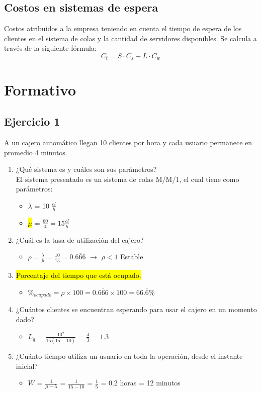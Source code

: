 \documentclass{templateNote}
\begin{document}
\subsection{Costos en sistemas de espera}
\noindent Costos atribuidos a la empresa teniendo en cuenta el tiempo de espera de los clientes en el sistema de colas y la cantidad de servidores disponibles. Se calcula a través de la siguiente fórmula:
\[
    C_t = S \cdot C_s + L \cdot C_w
\]


\newpage
\section{Formativo}
\subsection{Ejercicio 1}
\noindent A un cajero automático llegan 10 clientes por hora y cada usuario permanece en promedio 4 minutos.
\begin{enumerate}[label=(\alph*)]
    \item ¿Qué sistema es y cuáles son sus parámetros? \\
    El sistema presentado es un sistema de colas M/M/1, el cual tiene como parámetros:
    \begin{itemize}
        \item $\lambda$ = 10 $\frac{cl}{h}$
        \item \hl{$\mu$} = $\frac{60}{4} = 15 \frac{cl}{h}$ 
    \end{itemize}
    \item ¿Cuál es la tasa de utilización del cajero?
    \begin{itemize}
        \item $\rho = \frac{\lambda}{\mu} = \frac{10}{15} = 0.\overline{666}$ $\rightarrow$ $\rho < 1$ Estable
    \end{itemize}
    \item \hl{Porcentaje del tiempo que está ocupado.}
    \begin{itemize}
        \item $\%_{ocupado} = \rho \times 100 = 0.\overline{666} \times 100 = 66.\overline{6}\%$
    \end{itemize}
    \item ¿Cuántos clientes se encuentran esperando para usar el cajero en un momento dado?
    \begin{itemize}
        \item $L_q$ = $\frac{10^2}{15(15-10)}$ = $\frac{4}{3}$ = $1.\overline{3}$
    \end{itemize}
    \item ¿Cuánto tiempo utiliza un usuario en toda la operación, desde el instante inicial?
    \begin{itemize} 
        \item $W$ = $\frac{1}{\mu - \lambda}$ = $\frac{1}{15-10}$ = $\frac{1}{5}$ = 0.2 horas = 12 minutos   
    \end{itemize}
\end{enumerate}
\end{document}
